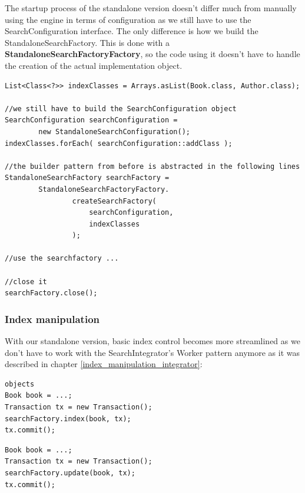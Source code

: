 The startup process of the standalone version doesn't differ much from manually using the engine in terms of configuration as we still have to use the SearchConfiguration interface. The only difference is how we build the StandaloneSearchFactory. This is done with a \textbf{StandaloneSearchFactoryFactory}, so the code using it doesn't have to handle the creation of the actual implementation object.
\\
\lstset{language=java}
\begin{lstlisting}[frame=htrbl, caption={Starting up the standalone version}, label={lst:using_standalone.java}]
List<Class<?>> indexClasses = Arrays.asList(Book.class, Author.class);

//we still have to build the SearchConfiguration object
SearchConfiguration searchConfiguration = 
		new StandaloneSearchConfiguration();
indexClasses.forEach( searchConfiguration::addClass );

//the builder pattern from before is abstracted in the following lines
StandaloneSearchFactory searchFactory = 
		StandaloneSearchFactoryFactory.
				createSearchFactory(
					searchConfiguration,
					indexClasses
				);
				
//use the searchfactory ...

//close it
searchFactory.close();
\end{lstlisting}

\pagebreak

\subsubsection{Index manipulation}

With our standalone version, basic index control becomes more streamlined as we don't have to work with the SearchIntegrator's Worker pattern anymore as it was described in chapter \ref{index_manipulation_integrator}:
\\
\lstset{language=java}
\begin{lstlisting}[frame=htrbl, caption={Indexing an object with the standalone version}, label={lst:indexing_object_native.java}]objects
Book book = ...;
Transaction tx = new Transaction();
searchFactory.index(book, tx);
tx.commit();
\end{lstlisting}

\lstset{language=java}
\begin{lstlisting}[frame=htrbl, caption={Updating an object with the standalone version}, label={lst:updating_object_native.java}]
Book book = ...;
Transaction tx = new Transaction();
searchFactory.update(book, tx);
tx.commit();
\end{lstlisting}

